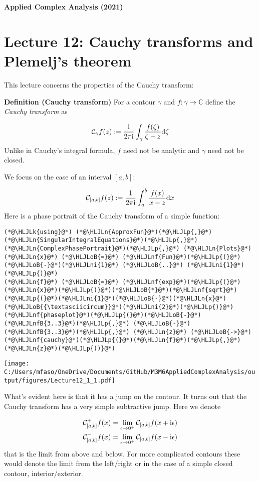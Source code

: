 \documentclass[12pt,a4paper]{article}
\newcommand{\HLJLk}[1]{\textcolor[RGB]{148,91,176}{\textbf{#1}}}
\newcommand{\HLJLn}[1]{#1}
\newcommand{\HLJLnf}[1]{\textcolor[RGB]{66,102,213}{#1}}
\newcommand{\HLJLnfB}[1]{\textcolor[RGB]{59,151,46}{#1}}
\newcommand{\HLJLni}[1]{\textcolor[RGB]{59,151,46}{#1}}
\newcommand{\HLJLoB}[1]{\textcolor[RGB]{102,102,102}{\textbf{#1}}}
\newcommand{\HLJLp}[1]{#1}
\def\D{ {\rm d} }
\def\I{ {\rm i} }
\def\C{ {\mathbb C} }
\def\CC{ {\cal C} }
\def\dx{\D x}
\begin{document}
\textbf{Applied Complex Analysis (2021)}

\section{Lecture 12: Cauchy transforms and Plemelj's theorem}
This lecture concerns the properties of the Cauchy transform:

\textbf{Definition (Cauchy transform)} For a contour $\gamma$ and $f : \gamma \rightarrow \C$ define the \emph{Cauchy transform} as

\[
\CC_\gamma f(z) := {1 \over 2 \pi \I} \int_\gamma {f(\zeta) \over \zeta - z} \D \zeta
\]
Unlike in Cauchy's integral formula, $f$ need not be analytic and $\gamma$ need not be closed.

We focus on the case of an interval $[a,b]$:

\[
\CC_{[a,b]} f(z) := {1 \over 2 \pi \I} \int_a^b {f(x) \over x - z} \dx
\]
Here is a phase portrait of the Cauchy transform of a simple function:


\begin{lstlisting}
(*@\HLJLk{using}@*) (*@\HLJLn{ApproxFun}@*)(*@\HLJLp{,}@*) (*@\HLJLn{SingularIntegralEquations}@*)(*@\HLJLp{,}@*) (*@\HLJLn{ComplexPhasePortrait}@*)(*@\HLJLp{,}@*) (*@\HLJLn{Plots}@*)
(*@\HLJLn{x}@*) (*@\HLJLoB{=}@*) (*@\HLJLnf{Fun}@*)(*@\HLJLp{(}@*)(*@\HLJLoB{-}@*)(*@\HLJLni{1}@*) (*@\HLJLoB{..}@*) (*@\HLJLni{1}@*)(*@\HLJLp{)}@*)
(*@\HLJLn{f}@*) (*@\HLJLoB{=}@*) (*@\HLJLnf{exp}@*)(*@\HLJLp{(}@*)(*@\HLJLn{x}@*)(*@\HLJLp{)}@*)(*@\HLJLoB{*}@*)(*@\HLJLnf{sqrt}@*)(*@\HLJLp{(}@*)(*@\HLJLni{1}@*)(*@\HLJLoB{-}@*)(*@\HLJLn{x}@*)(*@\HLJLoB{{\textasciicircum}}@*)(*@\HLJLni{2}@*)(*@\HLJLp{)}@*)
(*@\HLJLnf{phaseplot}@*)(*@\HLJLp{(}@*)(*@\HLJLoB{-}@*)(*@\HLJLnfB{3..3}@*)(*@\HLJLp{,}@*) (*@\HLJLoB{-}@*)(*@\HLJLnfB{3..3}@*)(*@\HLJLp{,}@*) (*@\HLJLn{z}@*) (*@\HLJLoB{->}@*) (*@\HLJLnf{cauchy}@*)(*@\HLJLp{(}@*)(*@\HLJLn{f}@*)(*@\HLJLp{,}@*)(*@\HLJLn{z}@*)(*@\HLJLp{))}@*)
\end{lstlisting}

\texttt{[image: C:/Users/mfaso/OneDrive/Documents/GitHub/M3M6AppliedComplexAnalysis/output/figures/Lecture12\_1\_1.pdf]}

What's evident here is that it has a jump on the contour. It turns out that the Cauchy transform has a very simple subtractive jump. Here we denote


\begin{align*}
    \CC_{[a,b]}^+ f(x) = \lim_{\epsilon \rightarrow 0^+} \CC_{[a,b]} f( x+ \I \epsilon)\\
        \CC_{[a,b]}^- f(x) = \lim_{\epsilon \rightarrow 0^+} \CC_{[a,b]} f( x- \I \epsilon)
        \end{align*}
that is the limit from above and below. For more complicated contours these would denote the limit from the left/right or in the case of a simple closed contour, interior/exterior.
\end{document}

